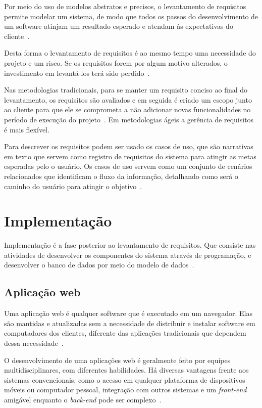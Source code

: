 Por meio do uso de modelos abstratos e precisos, o levantamento de requisitos permite modelar um sistema, de modo que todos os passos do desenvolvimento de um software atinjam um resultado esperado e atendam às expectativas do cliente~\cite{pressman2016engenharia}.

Desta forma o levantamento de requisitos é ao mesmo tempo uma necessidade do projeto e um risco.
Se os requisitos forem por algum motivo alterados, o investimento em levantá-los terá sido perdido~\cite{schimiguel2017tecnicas}.

Nas metodologias tradicionais, para se manter um requisito conciso ao final do levantamento, os requisitos são avaliados e em seguida é criado um escopo junto ao cliente para que ele se comprometa a não adicionar novas funcionalidades no período de execução do projeto~\cite{lutz2018implantaccao}.
Em metodologias ágeis a gerência de requisitos é mais flexível.


Para descrever os requisitos podem ser usado os casos de uso, que são narrativas em texto que servem como registro de requisitos do sistema para atingir as metas esperadas pelo o usuário.
Os casos de uso servem como um conjunto de cenários relacionados que identificam o fluxo da informação, detalhando como será o caminho do usuário para atingir o objetivo~\cite{larman2002utilizando}.

\section{Implementação}

Implementação é a fase posterior ao levantamento de requisitos.
Que consiste nas atividades de desenvolver os componentes do sistema através de programação, e desenvolver o banco de dados por meio do modelo de dados~\cite{azevedo2008definiccao}.

\subsection{Aplicação web}

Uma aplicação web é qualquer software que é executado em um navegador.
Elas são mantidas e atualizadas sem a necessidade de distribuir e instalar software em computadores dos clientes, diferente das aplicações tradicionais que dependem dessa necessidade~\cite{sampaio2004xwebprocess}.

O desenvolvimento de uma aplicações web é geralmente feito por equipes multidisciplinares, com diferentes habilidades.
Há diversas vantagens frente aos sistemas convencionais, como o acesso em qualquer plataforma de dispositivos móveis ou computador pessoal, integração com outros sistemas e um \textit{front-end} amigável enquanto o \textit{back-end} pode ser complexo~\cite{ferreira2015arquitetutura}. 

